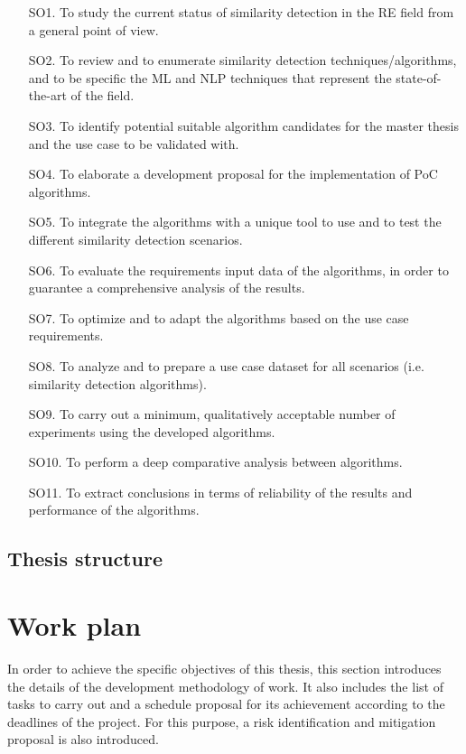 \documentclass[11pt]{article}
\begin{document}
\begin{enumerate}
\item[SO1.] To study the current status of similarity detection in the RE field from a general point of view.
\item[SO2.] To review and to enumerate similarity detection techniques/algorithms, and to be specific the ML and NLP techniques that represent the state-of-the-art of the field.
\item[SO3.] To identify potential suitable algorithm candidates for the master thesis and the use case to be validated with.
\item[SO4.] To elaborate a development proposal for the implementation of PoC algorithms.
\item[SO5.] To integrate the algorithms with a unique tool to use and to test the different similarity detection scenarios.
\item[SO6.] To evaluate the requirements input data of the algorithms, in order to guarantee a comprehensive analysis of the results.
\item[SO7.] To optimize and to adapt the algorithms based on the use case requirements.
\item[SO8.] To analyze and to prepare a use case dataset for all scenarios (i.e. similarity detection algorithms).
\item[SO9.] To carry out a minimum, qualitatively acceptable number of experiments using the developed algorithms.
\item[SO10.] To perform a deep comparative analysis between algorithms.
\item[SO11.] To extract conclusions in terms of reliability of the results and performance of the algorithms.
\end{enumerate}

\subsection{Thesis structure}



\section{Work plan}

In order to achieve the specific objectives of this thesis, this section introduces the details of the development methodology of work. It also includes the list of tasks to carry out and a schedule proposal for its achievement according to the deadlines of the project. For this purpose, a risk identification and mitigation proposal is also introduced.
\end{document}
